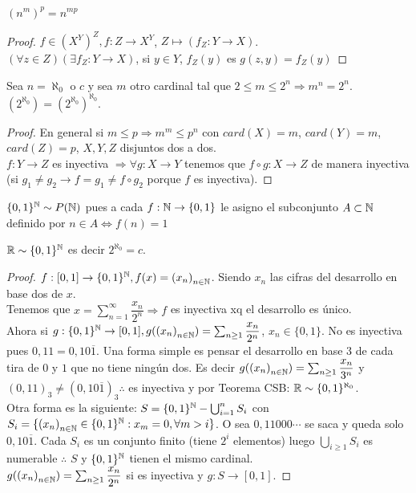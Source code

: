 \begin{prop}
  \((n^m)^p = n^{mp} \)
  \begin{proof}
    \(f \in (X^Y)^Z, f: Z \to X^Y\), \(Z \mapsto (f_Z: Y \to X)\). \\
    \((\forall z \in Z)(\exists f_Z: Y \to X)\), si \(y \in Y\), \(f_Z(y)\) es \(g(z, y) = f_Z(y)\)
  \end{proof}
\end{prop}

\begin{theorem}
  Sea \(n = \aleph_0\) o \(c\) y sea \(m\) otro cardinal tal que \(2 \leq m \leq 2^n \Rightarrow m^n = 2^n\). \((2^{\aleph_0}) = (2^{\aleph_0})^{\aleph_0} \).
  \begin{proof}
    En general si \(m \leq p \Rightarrow m^m \leq p^n\) con \(card(X) = m\), \(card(Y) = m\), \(card(Z) = p\), \(X,Y,Z\) disjuntos dos a dos. \\
    \(f: Y \to Z\) es inyectiva \(\Rightarrow \forall g: X \to Y\) tenemos que \(f \circ g: X \to Z\) de manera inyectiva (si \(g_1 \neq g_2 \to f = g_1 \neq f \circ g_2\) porque \(f\) es inyectiva).
  \end{proof}
\end{theorem}

\begin{note}
  \(\{ 0, 1 \}^{\mathbb{N}} \sim P(\mathbb{N})\) pues a cada \(f: \mathbb{N} \to \{0, 1\} \) le asigno el subconjunto \(A \subset \mathbb{N} \) definido por \(n \in A \iff f(n) = 1\)
\end{note}

\begin{theorem}
  \(\mathbb{R} \sim \{ 0, 1 \}^{\mathbb{N}} \) es decir \(2^{\aleph_0} = c\).
  \begin{proof}
    \(f: [0, 1] \to \{ 0, 1 \}^{\mathbb{N}}, f(x) = {(x_n)}_{n \in \mathbb{N}} \). Siendo \(x_n\) las cifras del desarrollo en base dos de \(x\). \\
    Tenemos que \(x = \sum_{n=1}^\infty \dfrac{x_n}{2^n} \Rightarrow f\) es inyectiva xq el desarrollo es único. \\
    Ahora si \(g: \{ 0, 1 \}^{\mathbb{N}} \to [0, 1], g({(x_n)}_{n \in \mathbb{N}}) = \sum_{n \geq 1} \dfrac{x_n}{2^n} \), \(x_n \in \{0, 1\} \). No es inyectiva pues \(0,11 = 0,10\overline{1} \).
    Una forma simple es pensar el desarrollo en base \(3\) de cada tira de \(0\) y \(1\) que no tiene ningún dos. Es decir \(g({(x_n)}_{n \in \mathbb{N}}) = \sum_{n \geq 1} \dfrac{x_n}{3^n} \) y \((0,11)_3 \neq (0,10\overline{1})_3 \therefore \)
    es inyectiva y por Teorema CSB: \(\mathbb{R} \sim \{0,1\}^{\aleph_0} \). \\
    Otra forma es la siguiente:
    \(S = \{0, 1\}^{\mathbb{N}} - \bigcup_{i=1}^n S_i\) con \(S_i = \{ {(x_n)}_{n \in \mathbb{N}} \in \{0, 1\}^{\mathbb{N}} : x_m = 0, \forall m > i \} \). O sea \(0,11000\cdots \) se saca y queda solo \(0,10\overline{1} \).
    Cada \(S_i\) es un conjunto finito (tiene \(2^i\) elementos) luego \(\bigcup_{i \geq 1} S_i\) es numerable \(\therefore \) \(S\) y \(\{0,1\}^{\mathbb{N}} \) tienen el mismo cardinal. \\
    \(g({(x_n)}_{n \in \mathbb{N}}) = \sum_{n \geq 1} \dfrac{x_n}{2^n} \) si es inyectiva y \(g: S \to [0, 1]\).
  \end{proof}
\end{theorem}

